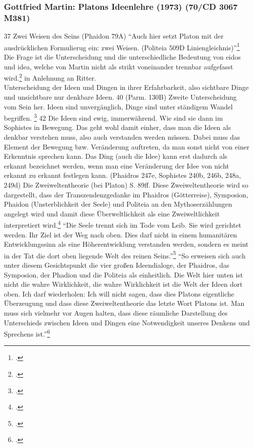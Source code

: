\documentclass[12pt]{article}
\begin{document}
\subsubsection*{Gottfried Martin: Platons Ideenlehre (1973) (70/CD 3067 M381)}
37 Zwei Weisen des Seins (Phaidon 79A)
\enquote{Auch hier setzt Platon mit der ausdrücklichen Formulierug ein: zwei Weisen. (Politeia 509D Liniengleichnis)}\footcite[][S. 39]{Martin73}
Die Frage ist die Unterscheidung und die unterschiedliche Bedeutung von eidos und idea, welche von Martin nicht als strikt voneinander trennbar aufgefasst wird.\footcite[vgl.][S. 39]{Martin73} in Anlehnung an Ritter.\\
Unterscheidung der Ideen und Dingen in ihrer Erfahrbarkeit, also sichtbare Dinge und unsichtbare nur denkbare Ideen. 40 (Parm. 130B) Zweite Unterscheidung vom Sein her. Ideen sind unvergänglich, Dinge sind unter ständigem Wandel begriffen. \footcite[vgl.][S. 41]{Martin73}
42 Die Ideen sind ewig, immerwährend. Wie sind sie dann im Sophistes in Bewegung. Das geht wohl damit einher, dass man die Ideen als denkbar verstehen muss, also auch verstanden werden müssen. Dabei muss das Element der Bewegung bzw. Veränderung auftreten, da man sonst nicht von einer Erkenntnis sprechen kann. Das Ding (auch die Idee) kann erst dadurch als erkannt bezeichnet werden, wenn man eine Veränderung der Idee von nicht erkannt zu erkannt festlegen kann. (Phaidros 247e, Sophistes 240b, 246b, 248a, 249d)
Die Zweiweltentheorie (bei Platon) S. 89ff.
Diese Zweiweltentheorie wird so dargestellt, dass der Transzendenzgedanke im Phaidros (Götterreise), Symposion, Phaidon (Unsterblichkeit der Seele) und Politeia an den Mythoserzählungen angelegt wird und damit diese Überweltlichkeit als eine Zweiweltlichkeit interpretiert wird.\footcite[vgl.][S. 88ff.]{Martin73}
\enquote{Die Seele trennt sich im Tode vom Leib. Sie wird gerichtet werden. Ihr Ziel ist der Weg nach oben. Dies darf nicht in einem humanitären Entwicklungssinn als eine Höherentwicklung verstanden werden, sondern es meint in der Tat die dort oben liegende Welt des reinen Seins.}\footcite[][S. 93]{Martin73}
\enquote{So erweisen sich auch unter diesem Gesichtspunkt die vier großen Ideendialoge, der Phaidros, das Symposion, der Phadion und die Politeia als einheitlich. Die Welt hier unten ist nicht die wahre Wirklichkeit, die wahre Wirklichkeit ist die Welt der Ideen dort oben. Ich darf wiederholen: Ich will nicht sagen, dass dies Platons eigentliche Überzeugung und dass diese Zweiweltentheorie das letzte Wort Platons ist. Man muss sich vielmehr vor Augen halten, dass diese räumliche Darstellung des Unterschieds zwischen Ideen und Dingen eine Notwendigkeit unseres Denkens und Sprechens ist.}\footcite[][S. 96]{Martin73}
\end{document}
